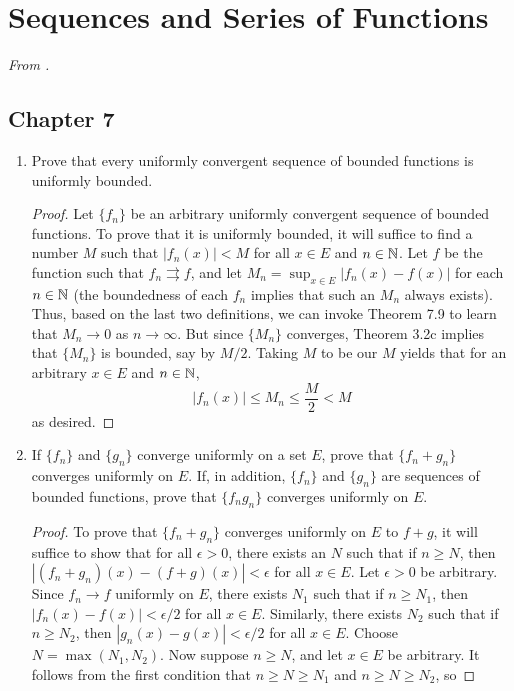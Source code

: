 \documentclass[../psets.tex]{subfiles}
\begin{document}
\section{Sequences and Series of Functions}
\emph{From \textcite{bib:Rudin}.}
\subsection*{Chapter 7}
\begin{enumerate}[label={\textbf{\arabic*.}}]
    \item {}Prove that every uniformly convergent sequence of bounded functions is uniformly bounded.
    \begin{proof}
        Let $\{f_n\}$ be an arbitrary uniformly convergent sequence of bounded functions. To prove that it is uniformly bounded, it will suffice to find a number $M$ such that $|f_n(x)|<M$ for all $x\in E$ and $n\in\mathbb{N}$. Let $f$ be the function such that $f_n\rightrightarrows f$, and let $M_n=\sup_{x\in E}|f_n(x)-f(x)|$ for each $n\in\mathbb{N}$ (the boundedness of each $f_n$ implies that such an $M_n$ always exists). Thus, based on the last two definitions, we can invoke Theorem 7.9 to learn that $M_n\to 0$ as $n\to\infty$. But since $\{M_n\}$ converges, Theorem 3.2c implies that $\{M_n\}$ is bounded, say by $M/2$. Taking $M$ to be our $M$ yields that for an arbitrary $x\in E$ and $n\in\mathbb{N}$,
        \begin{equation*}
            |f_n(x)| \leq M_n \leq \frac{M}{2} < M
        \end{equation*}
        as desired.
    \end{proof}
    \item If $\{f_n\}$ and $\{g_n\}$ converge uniformly on a set $E$, prove that $\{f_n+g_n\}$ converges uniformly on $E$. If, in addition, $\{f_n\}$ and $\{g_n\}$ are sequences of bounded functions, prove that $\{f_ng_n\}$ converges uniformly on $E$.
    \begin{proof}
        To prove that $\{f_n+g_n\}$ converges uniformly on $E$ to $f+g$, it will suffice to show that for all $\epsilon>0$, there exists an $N$ such that if $n\geq N$, then $|(f_n+g_n)(x)-(f+g)(x)|<\epsilon$ for all $x\in E$. Let $\epsilon>0$ be arbitrary. Since $f_n\to f$ uniformly on $E$, there exists $N_1$ such that if $n\geq N_1$, then $|f_n(x)-f(x)|<\epsilon/2$ for all $x\in E$. Similarly, there exists $N_2$ such that if $n\geq N_2$, then $|g_n(x)-g(x)|<\epsilon/2$ for all $x\in E$. Choose $N=\max(N_1,N_2)$. Now suppose $n\geq N$, and let $x\in E$ be arbitrary. It follows from the first condition that $n\geq N\geq N_1$ and $n\geq N\geq N_2$, so

\end{proof}
\end{enumerate}
\end{document}
